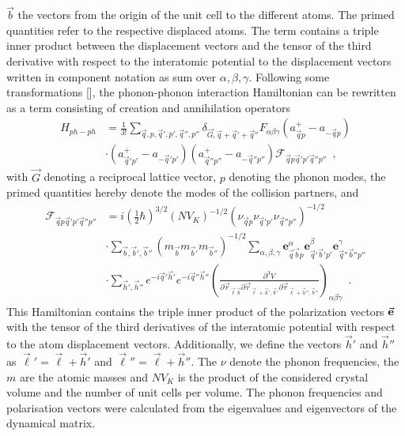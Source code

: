 \documentclass[ aps, prb, reprint, groupedaddress]{revtex4-1}
\makeatletter
\newcommand{\ffunc}{\mathcal{F}} %
\newcommand{\citen}[1]{\def\NAT@spacechar{}[\citenum{#1}]}
\makeatother
\begin{document}
$\vec{b}$ the vectors from 
the origin of the unit cell to the different atoms. The primed quantities
refer to the respective displaced atoms.
The term contains a triple inner product between the displacement vectors and the tensor of the third derivative with respect to the interatomic potential to the displacement vectors written in component notation
as sum over $\alpha, \beta, \gamma$.
Following some transformations \citen{ZimanElPhon}, the phonon-phonon interaction Hamiltonian can be rewritten as a term consisting of creation and annihilation operators
\begin{align}
H_{ph-ph} &= \frac{1}{3!} \sum_{\vec{q},p,\vec{q}',p',\vec{q}'',p''} \delta_{\vec{G},\vec{q}+\vec{q}'+\vec{q}''}  F_{\alpha \beta \gamma} (a_{\vec{q}p}^{+}-a_{-\vec{q}p}) 
\nonumber \\& \cdot (a_{\vec{q}'p'}^{+}-a_{-\vec{q}'p'}) (a_{\vec{q}''p''}^{+}-a_{-\vec{q}''p''}) \ffunc_{\vec{q}p\vec{q}'p'\vec{q}''p''} \enspace ,
\end{align}
with $\vec G$ denoting a reciprocal lattice vector, $p$ denoting the phonon modes, the primed quantities hereby denote the modes of the collision partners, and
\begin{align}
\ffunc_{\vec{q}p\vec{q}'p'\vec{q}''p''} &= i (\frac{1}{2} \hbar)^{3/2} (NV_K)^{-1/2} (\nu_{\vec{q}p} \nu_{\vec{q}'p'} \nu_{\vec{q}''p''})^{-1/2} 
\nonumber \\& \cdot \sum_{\vec{b},\vec{b}',\vec{b}''} (m_{\vec{b}} m_{\vec{b}'} m_{\vec{b}''})^{-1/2} 
 \sum_{\alpha, \beta, \gamma} {\textbf{e}}_{\vec{q}\vec{b}p}^{\alpha} {\textbf{e}}_{\vec{q}'\vec{b}'p'}^{\beta} {\textbf{e}}_{\vec{q}''\vec{b}''p''}^{\gamma} 
\nonumber \\& \cdot \sum_{\vec h',\vec h''} e^{-i\vec q'\vec h'}e^{-i\vec q''\vec h''} \left(\frac{\partial^3 V}
{\partial \vec r_{\vec{\ell} \vec b} \partial \vec r_{\vec{\ell}+\vec h',\vec b'} \partial \vec r_{\vec{\ell}+\vec h'', \vec b''}}\right)_{ \alpha \beta \gamma}  \enspace  .
\end{align}
This Hamiltonian contains the triple inner product of the polarization vectors $\vec {\bf e}$ with the tensor of the third derivatives of the interatomic potential with respect to the atom displacement vectors.
Additionally, we define the vectors $\vec{h}'$ and $\vec{h}''$ as $\vec{\ell}' = \vec{\ell} +\vec{h}'$ and $\vec{\ell}''= \vec{\ell} +\vec{h}''$.
The $\nu$ denote the phonon frequencies, the $m$ are the atomic masses and $NV_K$ is the product of the considered crystal volume and the number of unit cells per volume.
The phonon frequencies and polarisation vectors were calculated from the eigenvalues and eigenvectors of the dynamical matrix.
\end{document}
